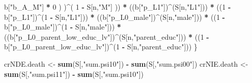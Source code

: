 \documentclass[
]{book}
\newenvironment{Shaded}{\begin{snugshade}}{\end{snugshade}}
\newcommand{\DecValTok}[1]{\textcolor[rgb]{0.00,0.00,0.81}{#1}}
\newcommand{\FunctionTok}[1]{\textcolor[rgb]{0.13,0.29,0.53}{\textbf{#1}}}
\newcommand{\NormalTok}[1]{#1}
\newcommand{\OtherTok}[1]{\textcolor[rgb]{0.56,0.35,0.01}{#1}}
\newcommand{\SpecialCharTok}[1]{\textcolor[rgb]{0.81,0.36,0.00}{\textbf{#1}}}
\newcommand{\StringTok}[1]{\textcolor[rgb]{0.31,0.60,0.02}{#1}}
\begin{document}
\begin{Shaded}
\begin{Highlighting}[]
\NormalTok{                b[}\StringTok{"b\_A\_M"}\NormalTok{] }\SpecialCharTok{*} \DecValTok{0}\NormalTok{ ) )}\SpecialCharTok{\^{}}\NormalTok{( }\DecValTok{1} \SpecialCharTok{{-}}\NormalTok{ S[n,}\StringTok{"M"}\NormalTok{] )) }\SpecialCharTok{*}
\NormalTok{      ((b[}\StringTok{"p\_L1"}\NormalTok{])}\SpecialCharTok{\^{}}\NormalTok{(S[n,}\StringTok{"L1"}\NormalTok{])) }\SpecialCharTok{*}
\NormalTok{      ((}\DecValTok{1} \SpecialCharTok{{-}}\NormalTok{ b[}\StringTok{"p\_L1"}\NormalTok{])}\SpecialCharTok{\^{}}\NormalTok{(}\DecValTok{1} \SpecialCharTok{{-}}\NormalTok{ S[n,}\StringTok{"L1"}\NormalTok{])) }\SpecialCharTok{*}
\NormalTok{      ((b[}\StringTok{"p\_L0\_male"}\NormalTok{])}\SpecialCharTok{\^{}}\NormalTok{(S[n,}\StringTok{"male"}\NormalTok{])) }\SpecialCharTok{*} 
\NormalTok{      ((}\DecValTok{1} \SpecialCharTok{{-}}\NormalTok{ b[}\StringTok{"p\_L0\_male"}\NormalTok{])}\SpecialCharTok{\^{}}\NormalTok{(}\DecValTok{1} \SpecialCharTok{{-}}\NormalTok{ S[n,}\StringTok{"male"}\NormalTok{])) }\SpecialCharTok{*} 
\NormalTok{      ((b[}\StringTok{"p\_L0\_parent\_low\_educ\_lv"}\NormalTok{])}\SpecialCharTok{\^{}}\NormalTok{(S[n,}\StringTok{"parent\_educ"}\NormalTok{])) }\SpecialCharTok{*}
\NormalTok{      ((}\DecValTok{1} \SpecialCharTok{{-}}\NormalTok{ b[}\StringTok{"p\_L0\_parent\_low\_educ\_lv"}\NormalTok{])}\SpecialCharTok{\^{}}\NormalTok{(}\DecValTok{1} \SpecialCharTok{{-}}\NormalTok{ S[n,}\StringTok{"parent\_educ"}\NormalTok{]))}
\NormalTok{    \}}
  
\NormalTok{  crNDE.death }\OtherTok{\textless{}{-}} \FunctionTok{sum}\NormalTok{(S[,}\StringTok{"sum.psi10"}\NormalTok{]) }\SpecialCharTok{{-}} \FunctionTok{sum}\NormalTok{(S[,}\StringTok{"sum.psi00"}\NormalTok{])}
\NormalTok{  crNIE.death }\OtherTok{\textless{}{-}} \FunctionTok{sum}\NormalTok{(S[,}\StringTok{"sum.psi11"}\NormalTok{]) }\SpecialCharTok{{-}} \FunctionTok{sum}\NormalTok{(S[,}\StringTok{"sum.psi10"}\NormalTok{])}
  

\end{Highlighting}
\end{Shaded}
\end{document}
